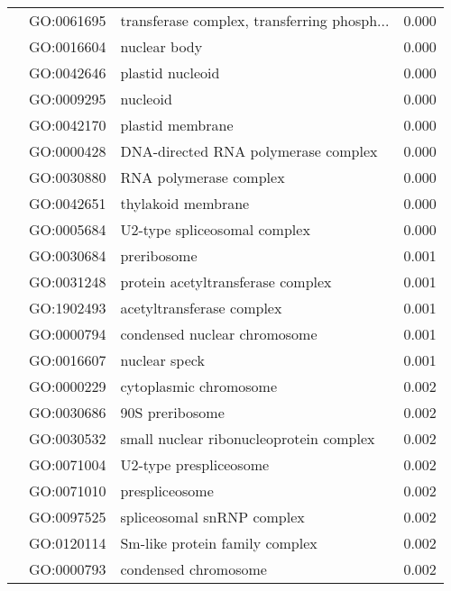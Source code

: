 \begin{longtable}{lllr}
   & GO:0061695 &  transferase complex, transferring phosph... &         0.000 \\
   & GO:0016604 &                                 nuclear body &         0.000 \\
   & GO:0042646 &                             plastid nucleoid &         0.000 \\
   & GO:0009295 &                                     nucleoid &         0.000 \\
   & GO:0042170 &                             plastid membrane &         0.000 \\
   & GO:0000428 &          DNA-directed RNA polymerase complex &         0.000 \\
   & GO:0030880 &                       RNA polymerase complex &         0.000 \\
   & GO:0042651 &                           thylakoid membrane &         0.000 \\
   & GO:0005684 &                 U2-type spliceosomal complex &         0.000 \\
   & GO:0030684 &                                  preribosome &         0.001 \\
   & GO:0031248 &            protein acetyltransferase complex &         0.001 \\
   & GO:1902493 &                    acetyltransferase complex &         0.001 \\
   & GO:0000794 &                 condensed nuclear chromosome &         0.001 \\
   & GO:0016607 &                                nuclear speck &         0.001 \\
   & GO:0000229 &                       cytoplasmic chromosome &         0.002 \\
   & GO:0030686 &                              90S preribosome &         0.002 \\
   & GO:0030532 &      small nuclear ribonucleoprotein complex &         0.002 \\
   & GO:0071004 &                       U2-type prespliceosome &         0.002 \\
   & GO:0071010 &                               prespliceosome &         0.002 \\
   & GO:0097525 &                   spliceosomal snRNP complex &         0.002 \\
   & GO:0120114 &               Sm-like protein family complex &         0.002 \\
   & GO:0000793 &                         condensed chromosome &         0.002 \\

\end{longtable}
